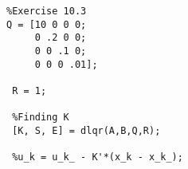 \sloppy
{}
\setlength{\parindent}{0pt}


    \begin{verbatim}
%Exercise 10.3
Q = [10 0 0 0;
     0 .2 0 0;
     0 0 .1 0;
     0 0 0 .01];

 R = 1;

 %Finding K
 [K, S, E] = dlqr(A,B,Q,R);

 %u_k = u_k_ - K'*(x_k - x_k_);
\end{verbatim}